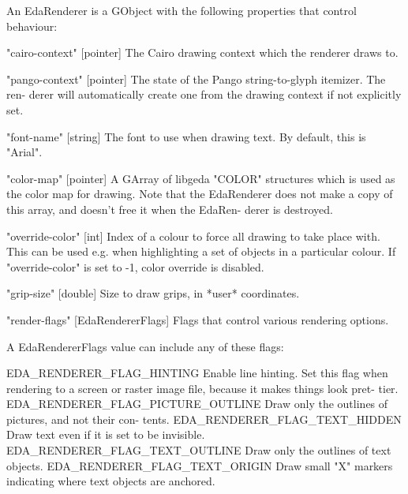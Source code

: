               An  EdaRenderer  is a GObject with the following properties that
              control behaviour:

                "cairo-context"  [pointer]
                    The Cairo drawing context which the renderer draws to.

                "pango-context"  [pointer]
                    The state of the Pango string-to-glyph itemizer. The  ren-
              derer
                    will  automatically create one from the drawing context if
              not
                    explicitly set.

                "font-name"  [string]
                    The font to use when drawing text.  By  default,  this  is
              "Arial".

                "color-map"  [pointer]
                    A  GArray  of  libgeda "COLOR" structures which is used as
              the
                    color map for drawing. Note that the EdaRenderer does  not
              make
                    a copy of this array, and doesn't free it when the EdaRen-
              derer
                    is destroyed.

                "override-color"  [int] Index of a colour to force all drawing
              to
                    take place with. This can be used e.g. when highlighting a
              set
                    of objects in a particular colour.  If "override-color" is
              set
                    to -1, color override is disabled.

                "grip-size"  [double]
                    Size to draw grips, in *user* coordinates.

                "render-flags"  [EdaRendererFlags]
                    Flags that control various rendering options.

              A EdaRendererFlags value can include any of these flags:

                EDA_RENDERER_FLAG_HINTING
                    Enable  line  hinting.  Set  this flag when rendering to a
              screen
                    or raster image file, because it makes things  look  pret-
              tier.
                EDA_RENDERER_FLAG_PICTURE_OUTLINE
                    Draw  only  the  outlines  of pictures, and not their con-
              tents.
                EDA_RENDERER_FLAG_TEXT_HIDDEN
                    Draw text even if it is set to be invisible.
                EDA_RENDERER_FLAG_TEXT_OUTLINE
                    Draw only the outlines of text objects.
                EDA_RENDERER_FLAG_TEXT_ORIGIN
                    Draw small "X" markers indicating where text objects are
                    anchored.

